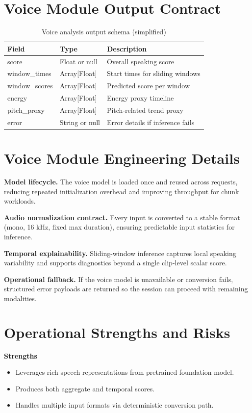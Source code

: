 \documentclass[12pt,a4paper]{report}
\begin{document}
\section{Voice Module Output Contract}
\begin{table}[H]
\centering
\caption{Voice analysis output schema (simplified)}
\begin{tabularx}{\textwidth}{>{\raggedright\arraybackslash}p{3.2cm} >{\raggedright\arraybackslash}p{2.5cm} Y}
\toprule
\textbf{Field} & \textbf{Type} & \textbf{Description} \\
\midrule
score & Float or null & Overall speaking score \\
window\_times & Array[Float] & Start times for sliding windows \\
window\_scores & Array[Float] & Predicted score per window \\
energy & Array[Float] & Energy proxy timeline \\
pitch\_proxy & Array[Float] & Pitch-related trend proxy \\
error & String or null & Error details if inference fails \\
\bottomrule
\end{tabularx}
\end{table}

\section{Voice Module Engineering Details}
\textbf{Model lifecycle.} The voice model is loaded once and reused across requests, reducing repeated initialization overhead and improving throughput for chunk workloads.

\textbf{Audio normalization contract.} Every input is converted to a stable format (mono, 16 kHz, fixed max duration), ensuring predictable input statistics for inference.

\textbf{Temporal explainability.} Sliding-window inference captures local speaking variability and supports diagnostics beyond a single clip-level scalar score.

\textbf{Operational fallback.} If the voice model is unavailable or conversion fails, structured error payloads are returned so the session can proceed with remaining modalities.

\section{Operational Strengths and Risks}
\textbf{Strengths}
\begin{itemize}[leftmargin=1.5em]
\item Leverages rich speech representations from pretrained foundation model.
\item Produces both aggregate and temporal scores.
\item Handles multiple input formats via deterministic conversion path.
\end{itemize}
\end{document}
